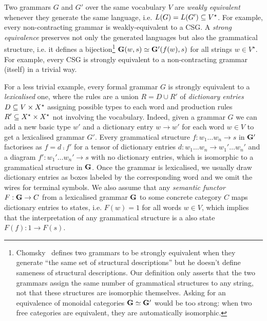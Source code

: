 Two grammars $G$ and $G'$ over the same vocabulary $V$ are \emph{weakly equivalent} whenever they generate the same language, i.e. $L(G) = L(G') \subseteq V^\star$.
For example, every non-contracting grammar is weakly-equivalent to a CSG.
A \emph{strong equivalence} preserves not only the generated languages but also the grammatical structure, i.e. it defines a bijection\footnote
{Chomsky~\cite{Chomsky63} defines two grammars to be strongly equivalent when they generate ``the same set of structural descriptions'' but he doesn't define sameness of structural descriptions.
Our definition only asserts that the two grammars assign the same number of grammatical structures to any string, not that these structures are isomorphic themselves.
Asking for an equivalence of monoidal categories $\mathbf{G} \simeq \mathbf{G}'$ would be too strong: when two free categories are equivalent, they are automatically isomorphic.} $\mathbf{G}(w, s) \simeq \mathbf{G}'(f(w), s)$ for all strings $w \in V^\star$.
For example, every CSG is strongly equivalent to a non-contracting grammar (itself) in a trivial way.

For a less trivial example, every formal grammar $G$ is strongly equivalent to a \emph{lexicalised} one, where the rules are a union $R = D \cup R'$ of \emph{dictionary entries} $D \subseteq V \times X^\star$ assigning possible types to each word and production rules $R' \subseteq X^\star \times X^\star$ not involving the vocabulary.
Indeed, given a grammar $G$ we can add a new basic type $w'$ and a dictionary entry $w \to w'$ for each word $w \in V$ to get a lexicalised grammar $G'$.
Every grammatical structure $f : w_1 \dots w_n \to s$ in $\mathbf{G}'$ factorises as $f = d \fcmp f'$ for a tensor of dictionary entries $d : w_1 \dots w_n \to w_1' \dots w_n'$ and a diagram $f' : w_1' \dots w_n' \to s$ with no dictionary entries, which is isomorphic to a grammatical structure in $\mathbf{G}$.
Once the grammar is lexicalised, we usually draw dictionary entries as boxes labeled by the corresponding word and we omit the wires for terminal symbols.
We also assume that any \emph{semantic functor} $F : \mathbf{G} \to C$ from a lexicalised grammar $\mathbf{G}$ to some concrete category $C$ maps dictionary entries to states, i.e. $F(w) = 1$ for all words $w \in V$, which  implies that the interpretation of any grammatical structure is a also state $F(f) : 1 \to F(s)$.

